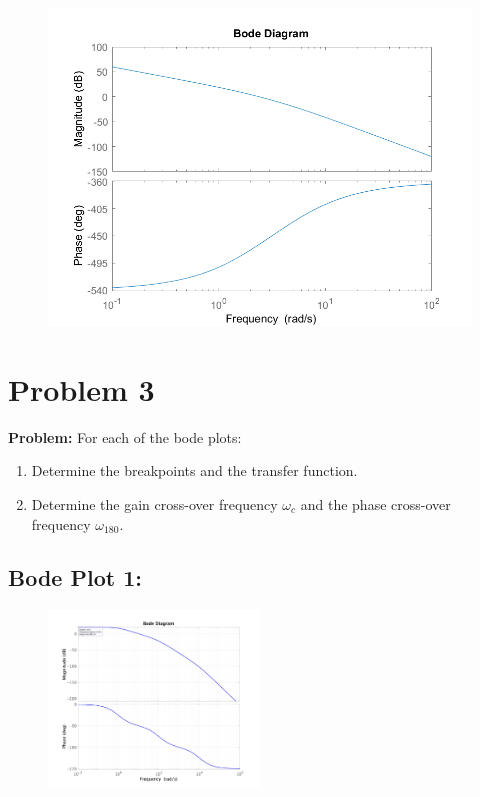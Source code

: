 \documentclass[letter]{article}
\numberwithin{equation}{section}
\begin{document}
\begin{figure}[h!]
	\centering
	\includegraphics[width=\textwidth]{figs/pblm2f.png}
\end{figure}

\newpage
\section{Problem 3}
\textbf{Problem:}
For each of the bode plots:
\begin{enumerate}
	\item Determine the breakpoints and the transfer function.
	\item Determine the gain cross-over frequency $\omega_c$ and the phase cross-over frequency $\omega_{180}$.
\end{enumerate}

\subsection{Bode Plot 1:}
\begin{figure}[ht]
	\centering
	\includegraphics[width=0.5\textwidth]{figs/pblm3a.jpg}
\end{figure}
\end{document}
